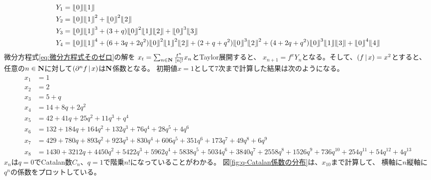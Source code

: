 {\begin{landscape}
\begin{note}[符号の計算]
\begin{equation}
\begin{split}
			Y_1 &= \word{0}\word{1} \\
			Y_2 &= \word{0}\word{1}^2 + \word{0}^2\word{2} \\
			Y_3 &= \word{0}\word{1}^3 + (3 + q)\word{0}^2\word{1}\word{2} 
				+ \word{0}^3\word{3}\\
			Y_4 &= \word{0}\word{1}^4 + (6 + 3q + 2q^2)\word{0}^2\word{1}^2\word{2}
				+ (2 + q + q^2)\word{0}^3\word{2}^2
				+ (4 + 2q + q^2)\word{0}^3\word{1}\word{3} + \word{0}^4\word{4}		
		\end{split}\end{equation}
		微分方程式\ref{eq:微分方程式そのゼロ}の解を
		$x_t = \sum_{n\in\mathbf{N}}\frac{t^n}{{\mathinner{[{n}]}}!} x_n$とTaylor展開すると、
		$x_{n+1} = f^xY_n$となる。そして、$(f{\,|\,} x)=x^2$とすると、
		任意の$n\in\mathbf{N}$に対して$(\partial^nf{\,|\,} x)$は$\mathbf{N}$係数となる。
		初期値$x=1$として$7$次まで計算した結果は次のようになる。
		\begin{equation*}\begin{split}
			x_1 &= 1 \\
			x_2 &= 2 \\
			x_3 &= 5 + q \\
			x_4 &= 14 + 8q + 2q^2 \\
			x_5 &= 42 + 41q + 25q^2 + 11q^3 + q^4 \\
			x_6 &= 132 + 184q + 164q^2 + 132q^3 + 76q^4 + 28q^5 + 4q^6 \\
			x_7 &= 429 + 780q + 893q^2 + 923q^3 + 830q^4 + 606q^5 + 351q^6
				+ 173q^7 + 49q^8 + 6q^9 \\
			x_8 &= 1430 + 3212q + 4450q^2 + 5422q^3 + 5962q^4 + 5838q^5 
				+ 5034q^6 + 3840q^7 + 2558q^8 + 1526q^9 + 736q^{10} + 254q^{11} 
				+ 54q^12 + 4q^{13}
		\end{split}\end{equation*}
		$x_n$は$q=0$でCatalan数$C_n$、$q=1$で階乗$n!$になっていることがわかる。
		図\ref{fig:q-Catalan係数の分布}は、$x_{10}$まで計算して、
		横軸に$n$縦軸に$q^n$の係数をプロットしている。\EOP
	\end{note} %
\end{landscape}

}

